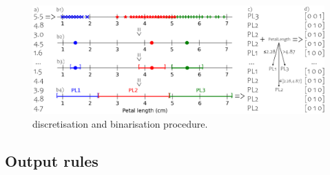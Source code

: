 \documentclass[12pt,a4paper,openright,twoside]{book}
\begin{document}
\begin{figure}
    \centering
    \includegraphics[width=\linewidth]{figures/disc.pdf}
    \caption{\psyke{} discretisation and binarisation procedure.}
    \label{fig:discretisation}
\end{figure}

\subsection{Output rules}
\end{document}
